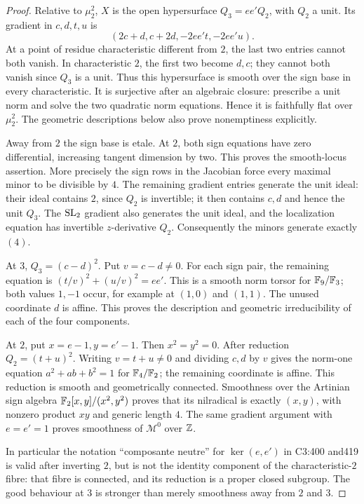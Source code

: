 \begin{proof}
Relative to $\mu_2^2$, $X$ is the open hypersurface
$Q_3=ee'Q_2$, with $Q_2$ a unit. Its gradient in $c,d,t,u$ is
\[
 (2c+d,c+2d,-2ee't,-2ee'u).
\]
At a point of residue characteristic different from $2$, the
last two entries cannot both vanish. In characteristic $2$,
the first two become $d,c$; they cannot both vanish since
$Q_3$ is a unit. Thus this hypersurface is smooth over the sign
base in every characteristic. It is surjective after an
algebraic closure: prescribe a unit norm and solve the two
quadratic norm equations. Hence it is faithfully flat over
$\mu_2^2$. The geometric descriptions below also prove
nonemptiness explicitly.

Away from $2$ the sign base is etale. At $2$, both sign
equations have zero differential, increasing tangent dimension
by two. This proves the smooth-locus assertion. More precisely
the sign rows in the Jacobian force every maximal minor to
be divisible by $4$. The remaining gradient entries generate
the unit ideal: their ideal contains $2$, since $Q_2$ is
invertible; it then contains $c,d$ and hence the unit $Q_3$.
The $\operatorname{SL}_2$ gradient also generates the unit ideal, and the
localization equation has invertible $z$-derivative $Q_2$.
Consequently the minors generate exactly $(4)$.

At $3$, $Q_3=(c-d)^2$. Put $v=c-d\ne0$.
For each sign pair, the remaining equation is
$(t/v)^2+(u/v)^2=ee'$. This is a smooth norm torsor for
$\mathbb F_9/\mathbb F_3$; both values $1,-1$ occur, for example at
$(1,0)$ and $(1,1)$. The unused coordinate $d$ is affine.
This proves the description and geometric irreducibility of
each of the four components.

At $2$, put $x=e-1,y=e'-1$. Then $x^2=y^2=0$.
After reduction $Q_2=(t+u)^2$. Writing $v=t+u\ne0$ and
dividing $c,d$ by $v$ gives the norm-one equation
$a^2+ab+b^2=1$ for $\mathbb F_4/\mathbb F_2$; the remaining coordinate is
affine. This reduction is smooth and geometrically connected.
Smoothness over the Artinian sign algebra
$\mathbb F_2[x,y]/(x^2,y^2)$ proves that its nilradical is exactly
$(x,y)$, with nonzero product $xy$ and generic length $4$.
The same gradient argument with $e=e'=1$ proves smoothness
of $\mathcal M^0$ over $\mathbb Z$.

In particular the notation ``composante neutre'' for
$\ker(e,e')$ in C3:400 and419 is valid after inverting $2$,
but is not the identity component of the characteristic-$2$
fibre: that fibre is connected, and its reduction is a proper
closed subgroup. The good behaviour at $3$ is stronger than
merely smoothness away from $2$ and $3$.
\end{proof}

